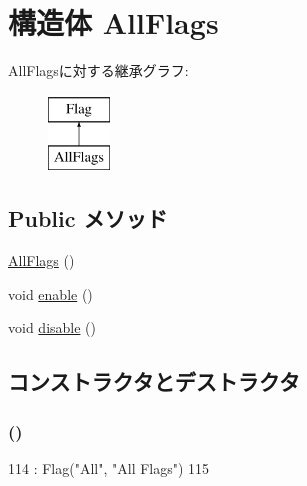 \hypertarget{structDebug_1_1AllFlags}{
\section{構造体 AllFlags}
\label{structDebug_1_1AllFlags}
}
AllFlagsに対する継承グラフ:\begin{figure}[H]
\begin{center}
\leavevmode
\includegraphics[height=2cm]{structDebug_1_1AllFlags}
\end{center}
\end{figure}
\subsection*{Public メソッド}
\begin{DoxyCompactItemize}
\item 
\hyperlink{structDebug_1_1AllFlags_af198ca73a3171a9151a139d163fa7678}{AllFlags} ()
\item 
void \hyperlink{structDebug_1_1AllFlags_a486f22824bd83c5308a0d70ffac6f758}{enable} ()
\item 
void \hyperlink{structDebug_1_1AllFlags_a8cfbbe53c1cf6e3054736daea3044c0f}{disable} ()
\end{DoxyCompactItemize}


\subsection{コンストラクタとデストラクタ}
\hypertarget{structDebug_1_1AllFlags_af198ca73a3171a9151a139d163fa7678}{
\subsubsection[{AllFlags}]{ ()}}
\label{structDebug_1_1AllFlags_af198ca73a3171a9151a139d163fa7678}



\begin{DoxyCode}
114         : Flag("All", "All Flags")
115     {}
\end{DoxyCode}


